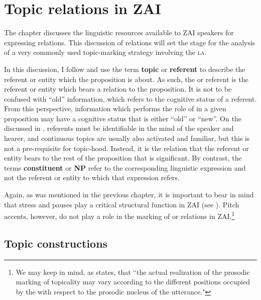 \chapter{Topic relations in ZAI}\label{topicchapter}

The chapter discusses the linguistic resources available to ZAI speakers for expressing  relations. This discussion of  relations will set the stage for the analysis of a very commonly used topic-marking strategy involving the  \textsc{la}.

In this discussion, I follow \citet{lambrecht1994} and use the term \textbf{topic} or \textbf{ referent} to describe the referent or entity which the proposition is about. As such, the  or  referent is the referent or entity which bears a  relation to the proposition. It is not to be confused with ``old'' information, which refers to the cognitive status of a referent. From this perspective, information which performs the role of  in a given proposition may have a cognitive status that is either ``old'' or ``new''. On the  discussed in ,  referents must be identifiable in the mind of the speaker and hearer, and continuous topics are usually also activated and familiar, but this is not a pre-requisite for topic-hood. Instead, it is the relation that the  referent or entity bears to the rest of the proposition that is significant. By contrast, the terms \textbf{ constituent} or \textbf{ NP} refer to the corresponding linguistic expression and not the referent or entity to which that expression refers. 

Again, as was mentioned in the previous chapter, it is important to bear in mind that stress and pauses play a critical structural function in ZAI  (see ). Pitch accents, however, do not play a role in the marking of  or  relations in ZAI.\footnote{We may keep in mind, as \citet[15]{crocco2009} states, that ``the actual realization of the prosodic marking of topicality may vary according to the different positions occupied by the  with respect to the prosodic nucleus of the utterance."} 

 

\section{Topic constructions}\label{topicconstructionssection}


